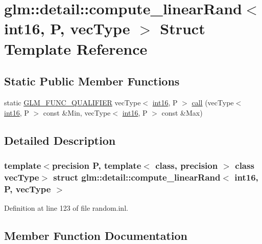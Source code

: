 \hypertarget{structglm_1_1detail_1_1compute__linear_rand_3_01int16_00_01_p_00_01vec_type_01_4}{}\section{glm\+::detail\+::compute\+\_\+linear\+Rand$<$ int16, P, vec\+Type $>$ Struct Template Reference}
\label{structglm_1_1detail_1_1compute__linear_rand_3_01int16_00_01_p_00_01vec_type_01_4}
\subsection*{Static Public Member Functions}
\begin{DoxyCompactItemize}
\item 
static \mbox{\hyperlink{setup_8hpp_a33fdea6f91c5f834105f7415e2a64407}{G\+L\+M\+\_\+\+F\+U\+N\+C\+\_\+\+Q\+U\+A\+L\+I\+F\+I\+ER}} vec\+Type$<$ \mbox{\hyperlink{namespaceglm_1_1detail_a375938874ca4f0a0982ec6373b56117b}{int16}}, P $>$ \mbox{\hyperlink{structglm_1_1detail_1_1compute__linear_rand_3_01int16_00_01_p_00_01vec_type_01_4_a2cf2a727838709537e66cef0fe48b236}{call}} (vec\+Type$<$ \mbox{\hyperlink{namespaceglm_1_1detail_a375938874ca4f0a0982ec6373b56117b}{int16}}, P $>$ const \&Min, vec\+Type$<$ \mbox{\hyperlink{namespaceglm_1_1detail_a375938874ca4f0a0982ec6373b56117b}{int16}}, P $>$ const \&Max)
\end{DoxyCompactItemize}


\subsection{Detailed Description}
\subsubsection*{template$<$precision P, template$<$ class, precision $>$ class vec\+Type$>$\newline
struct glm\+::detail\+::compute\+\_\+linear\+Rand$<$ int16, P, vec\+Type $>$}



Definition at line 123 of file random.\+inl.



\subsection{Member Function Documentation}
\mbox{\label{structglm_1_1detail_1_1compute__linear_rand_3_01int16_00_01_p_00_01vec_type_01_4_a2cf2a727838709537e66cef0fe48b236}} 
